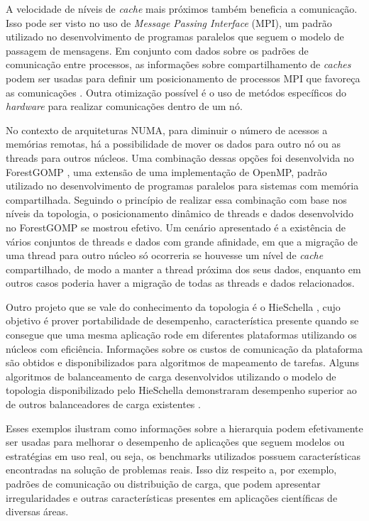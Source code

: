 A velocidade de níveis de \textit{cache} mais próximos também beneficia a comunicação.
Isso pode ser visto no uso de \textit{Message Passing Interface} (MPI), um padrão utilizado no desenvolvimento de programas paralelos que seguem o modelo de passagem de mensagens.
Em conjunto com dados sobre os padrões de comunicação entre processos, as informações sobre compartilhamento de \textit{caches} podem ser usadas para definir um posicionamento de processos MPI que favoreça as comunicações \cite{hwloc2010}.
Outra otimização possível é o uso de metódos específicos do \textit{hardware} para realizar comunicações dentro de um nó.

No contexto de arquiteturas NUMA, para diminuir o número de acessos a memórias remotas, há a possibilidade de mover os dados para outro nó ou as threads para outros núcleos.
Uma combinação dessas opções foi desenvolvida no ForestGOMP \cite{FGOMP}, uma extensão de uma implementação de OpenMP, padrão utilizado no desenvolvimento de programas paralelos para sistemas com memória compartilhada.
Seguindo o princípio de realizar essa combinação com base nos níveis da topologia, o posicionamento dinâmico de threads e dados desenvolvido no ForestGOMP se mostrou efetivo.
Um cenário apresentado é a existência de vários conjuntos de threads e dados com grande afinidade, em que a migração de uma thread para outro núcleo só ocorreria se houvesse um nível de \textit{cache} compartilhado, de modo a manter a thread próxima dos seus dados, enquanto em outros casos poderia haver a migração de todas as threads e dados relacionados.

Outro projeto que se vale do conhecimento da topologia é o HieSchella \cite{HieSchella},
cujo objetivo é prover portabilidade de desempenho, característica presente quando se consegue que
uma mesma aplicação rode em diferentes plataformas utilizando os núcleos com eficiência.
Informações sobre os custos de comunicação da plataforma são obtidos e disponibilizados para algoritmos de mapeamento de tarefas.
Alguns algoritmos de balanceamento de carga desenvolvidos utilizando o modelo de topologia disponibilizado pelo HieSchella demonstraram desempenho superior ao de outros balanceadores de carga existentes \cite{tese}.

Esses exemplos ilustram como informações sobre a hierarquia podem efetivamente ser usadas para melhorar o desempenho de aplicações que seguem modelos ou estratégias em uso real, ou seja, os benchmarks utilizados possuem características encontradas na solução de problemas reais.
Isso diz respeito a, por exemplo, padrões de comunicação ou distribuição de carga, que podem apresentar irregularidades e outras características presentes em aplicações científicas de diversas áreas.



